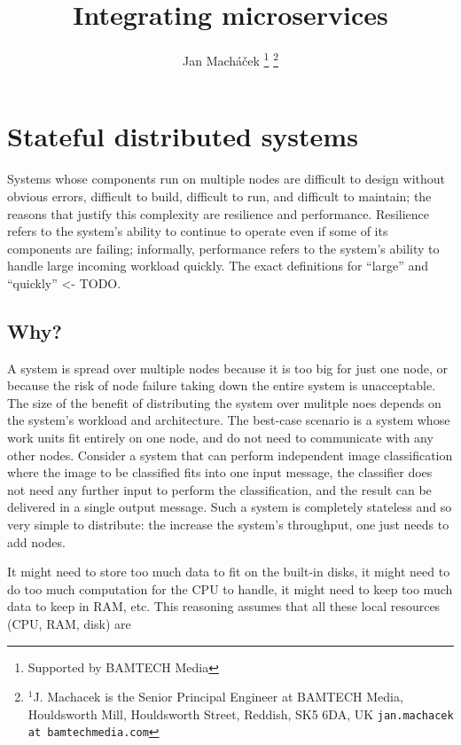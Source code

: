 \documentclass[10 pt, twocolumn]{article}
\title{Integrating microservices}
\author{Jan Mach{\'a}\v{c}ek%
\thanks{Supported by BAMTECH Media}%
\thanks{$^{1}$J. Machacek is the Senior Principal Engineer at BAMTECH Media, Houldsworth Mill, Houldsworth Street, Reddish, SK5 6DA, UK {\tt\small jan.machacek at bamtechmedia.com}}%
}
\begin{document}

\section{Stateful distributed systems}
Systems whose components run on multiple nodes are difficult to design without obvious errors, difficult to build, difficult to run, and difficult to maintain; the reasons that justify this complexity are resilience and performance. Resilience refers to the system's ability to continue to operate even if some of its components are failing; informally, performance refers to the system's ability to handle large incoming workload quickly. The exact definitions for ``large'' and ``quickly'' <- TODO.

\subsection{Why?}
A system is spread over multiple nodes because it is too big for just one node, or because the risk of node failure taking down the entire system is unacceptable. The size of the benefit of distributing the system over mulitple noes depends on the system's workload and architecture. The best-case scenario is a system whose work units fit entirely on one node, and do not need to communicate with any other nodes. Consider a system that can perform independent image classification where the image to be classified fits into one input message, the classifier does not need any further input to perform the classification, and the result can be delivered in a single output message. Such a system is completely stateless and so very simple to distribute: the increase the system's throughput, one just needs to add nodes.

It might need to store too much data to fit on the built-in disks, it might need to do too much computation for the CPU to handle, it might need to keep too much data to keep in RAM, etc. This reasoning assumes that all these local resources (CPU, RAM, disk) are 
\end{document}
